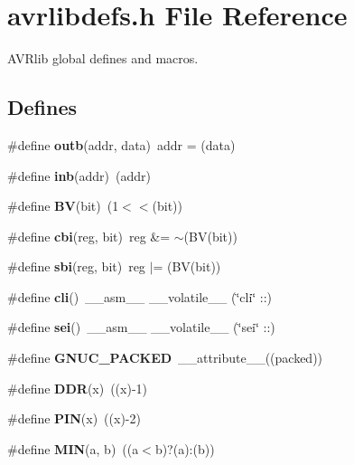 \section{avrlibdefs.h File Reference}
\label{avrlibdefs_8h}
AVRlib global defines and macros.  


\subsection*{Defines}
\begin{CompactItemize}
\item 
\#define \textbf{outb}(addr, data)~addr = (data)\label{avrlibdefs_8h_e561444dd5a69b5ac942afb6abaaa18f}

\item 
\#define \textbf{inb}(addr)~(addr)\label{avrlibdefs_8h_6324892f8728986cf9ff0a153210c670}

\item 
\#define \textbf{BV}(bit)~(1$<$$<$(bit))\label{avrlibdefs_8h_0188837b5508334447b93ad7b944a0e9}

\item 
\#define \textbf{cbi}(reg, bit)~reg \&= $\sim$(BV(bit))\label{avrlibdefs_8h_a088c60e054842f8d77d5bcd8a863a81}

\item 
\#define \textbf{sbi}(reg, bit)~reg $|$= (BV(bit))\label{avrlibdefs_8h_f99479fff216597a9fa50b0187920509}

\item 
\#define \textbf{cli}()~\_\-\_\-asm\_\-\_\- \_\-\_\-volatile\_\-\_\- (\char`\"{}cli\char`\"{} ::)\label{avrlibdefs_8h_68c330e94fe121eba993e5a5973c3162}

\item 
\#define \textbf{sei}()~\_\-\_\-asm\_\-\_\- \_\-\_\-volatile\_\-\_\- (\char`\"{}sei\char`\"{} ::)\label{avrlibdefs_8h_ad5ebd34cb344c26ac87594f79b06b73}

\item 
\#define \textbf{GNUC\_\-PACKED}~\_\-\_\-attribute\_\-\_\-((packed))\label{avrlibdefs_8h_83634509fe5a3541db37e16a1964d0df}

\item 
\#define \textbf{DDR}(x)~((x)-1)\label{avrlibdefs_8h_cbe348573e1b5adccdc7bcf157dc6425}

\item 
\#define \textbf{PIN}(x)~((x)-2)\label{avrlibdefs_8h_d7581da21e9fd6fd6f6920dd68d1c782}

\item 
\#define \textbf{MIN}(a, b)~((a$<$b)?(a):(b))\label{avrlibdefs_8h_3acffbd305ee72dcd4593c0d8af64a4f}


\end{CompactItemize}
